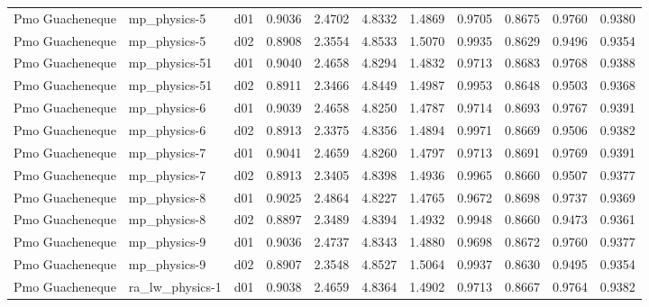 \begin{longtable}{lllrrrrrrrr}
      Pmo Guacheneque  &          mp\_physics-5 &     d01 &   0.9036 &   2.4702 &   4.8332 &       1.4869 &        0.9705 &       0.8675 &           0.9760 &  0.9380 \\
      Pmo Guacheneque  &          mp\_physics-5 &     d02 &   0.8908 &   2.3554 &   4.8533 &       1.5070 &        0.9935 &       0.8629 &           0.9496 &  0.9354 \\
      Pmo Guacheneque  &         mp\_physics-51 &     d01 &   0.9040 &   2.4658 &   4.8294 &       1.4832 &        0.9713 &       0.8683 &           0.9768 &  0.9388 \\
      Pmo Guacheneque  &         mp\_physics-51 &     d02 &   0.8911 &   2.3466 &   4.8449 &       1.4987 &        0.9953 &       0.8648 &           0.9503 &  0.9368 \\
      Pmo Guacheneque  &          mp\_physics-6 &     d01 &   0.9039 &   2.4658 &   4.8250 &       1.4787 &        0.9714 &       0.8693 &           0.9767 &  0.9391 \\
      Pmo Guacheneque  &          mp\_physics-6 &     d02 &   0.8913 &   2.3375 &   4.8356 &       1.4894 &        0.9971 &       0.8669 &           0.9506 &  0.9382 \\
      Pmo Guacheneque  &          mp\_physics-7 &     d01 &   0.9041 &   2.4659 &   4.8260 &       1.4797 &        0.9713 &       0.8691 &           0.9769 &  0.9391 \\
      Pmo Guacheneque  &          mp\_physics-7 &     d02 &   0.8913 &   2.3405 &   4.8398 &       1.4936 &        0.9965 &       0.8660 &           0.9507 &  0.9377 \\
      Pmo Guacheneque  &          mp\_physics-8 &     d01 &   0.9025 &   2.4864 &   4.8227 &       1.4765 &        0.9672 &       0.8698 &           0.9737 &  0.9369 \\
      Pmo Guacheneque  &          mp\_physics-8 &     d02 &   0.8897 &   2.3489 &   4.8394 &       1.4932 &        0.9948 &       0.8660 &           0.9473 &  0.9361 \\
      Pmo Guacheneque  &          mp\_physics-9 &     d01 &   0.9036 &   2.4737 &   4.8343 &       1.4880 &        0.9698 &       0.8672 &           0.9760 &  0.9377 \\
      Pmo Guacheneque  &          mp\_physics-9 &     d02 &   0.8907 &   2.3548 &   4.8527 &       1.5064 &        0.9937 &       0.8630 &           0.9495 &  0.9354 \\
      Pmo Guacheneque  &       ra\_lw\_physics-1 &     d01 &   0.9038 &   2.4659 &   4.8364 &       1.4902 &        0.9713 &       0.8667 &           0.9764 &  0.9382 \\

\end{longtable}
